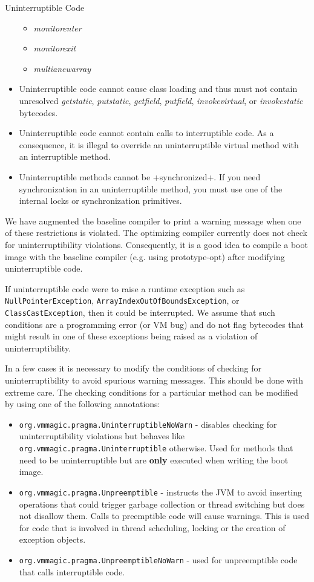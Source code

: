 \begin{section}{Uninterruptible Code}
\begin{itemize}
\begin{itemize}
      \item \textit{monitorenter}
      \item \textit{monitorexit}
      \item \textit{multianewarray}
    \end{itemize}
  \item Uninterruptible code cannot cause class loading and thus must not contain unresolved \textit{getstatic}, \textit{putstatic}, \textit{getfield}, \textit{putfield}, \textit{invokevirtual}, or \textit{invokestatic} bytecodes.
  \item Uninterruptible code cannot contain calls to interruptible code. As a consequence, it is illegal to override an uninterruptible virtual method with an interruptible method.
  \item Uninterruptible methods cannot be \spverb+synchronized+. If you need synchronization in an uninterruptible method, you must use one of the internal locks or synchronization primitives.
\end{itemize}

We have augmented the baseline compiler to print a warning message when one of these restrictions is violated. The optimizing compiler currently does not check for uninterruptibility violations. Consequently, it is a good idea to compile a boot image with the baseline compiler (e.g. using prototype-opt) after modifying uninterruptible code.

If uninterruptible code were to raise a runtime exception such as \texttt{Null\-Poin\-ter\-Ex\-ce\-ption}, \texttt{Ar\-ray\-In\-dex\-Out\-Of\-Bounds\-Ex\-ce\-ption}, or \texttt{Class\-Cast\-Ex\-ce\-ption}, then it could be interrupted. We assume that such conditions are a programming error (or VM bug) and do not flag bytecodes that might result in one of these exceptions being raised as a violation of uninterruptibility.

In a few cases it is necessary to modify the conditions of checking for uninterruptibility to avoid spurious warning messages. This should be done with extreme care. The checking conditions for a particular method can be modified by using one of the following annotations:
\begin{itemize}
  \item \texttt{org.vm\-ma\-gic.prag\-ma.Un\-in\-ter\-rup\-ti\-ble\-No\-Warn} - disables checking for uninterruptibility violations but behaves like \texttt{org.vm\-ma\-gic.pra\-gma.Un\-in\-ter\-rup\-ti\-ble} otherwise. Used for methods that need to be uninterruptible but are \textbf{only} executed when writing the boot image.
  \item \texttt{org.vm\-ma\-gic.pra\-gma.Un\-pre\-emp\-tib\-le} - instructs the JVM to avoid inserting operations that could trigger garbage collection or thread switching but does not disallow them. Calls to preemptible code will cause warnings. This is used for code that is involved in thread scheduling, locking or the creation of exception objects.
  \item \texttt{org.vm\-ma\-gic.pra\-gma.Un\-pre\-emp\-tib\-le\-No\-Warn} - used for unpreemptible code that calls interruptible code.
\end{itemize}


\end{section}
